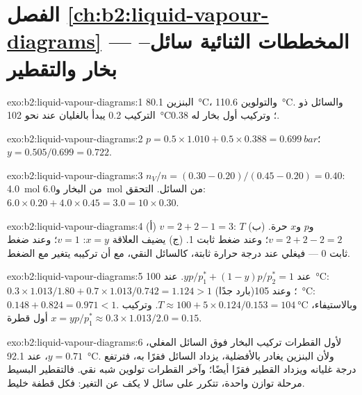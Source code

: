 \section*{الفصل \ref{ch:b2:liquid-vapour-diagrams} --- المخططات الثنائية سائل--بخار والتقطير}

\begin{solution}{exo:b2:liquid-vapour-diagrams:1}
البنزين \qty{80.1}{\degreeCelsius}، والتولوين \qty{110.6}{\degreeCelsius}. والسائل
ذو التركيب 0.2 يبدأ بالغليان عند نحو \qty{102}{\degreeCelsius}؛ وتركيب أول
بخار له 0.38.
\end{solution}

\begin{solution}{exo:b2:liquid-vapour-diagrams:2}
$p = 0.5 \times 1.010 + 0.5 \times 0.388 = \qty{0.699}{bar}$؛
$y = 0.505/0.699 = 0.722$.
\end{solution}

\begin{solution}{exo:b2:liquid-vapour-diagrams:3}
$n_V/n = (0.30 - 0.20)/(0.45 - 0.20) = 0.40$: \qty{4.0}{mol} من البخار 
و\qty{6.0}{mol} من السائل. التحقق: $6.0 \times 0.20 + 4.0 \times 0.45 = 3.0 = 10
\times 0.30$.
\end{solution}

\begin{solution}{exo:b2:liquid-vapour-diagrams:4}
(أ) $v = 2 + 2 - 1 = 3$: $T$ و$p$ و$x$ حرة. (ب) $v = 2 + 2 - 2 = 2$؛ وعند
ضغط ثابت 1. (ج) يضيف  العلاقة $x = y$: $v = 1$؛ وعند ضغط ثابت
0 --- فيغلي  عند درجة حرارة ثابتة، كالسائل النقي،
مع أن تركيبه يتغير مع الضغط.
\end{solution}

\begin{solution}{exo:b2:liquid-vapour-diagrams:5}
عند  $yp/p_1^* + (1 - y)p/p_2^* = 1$. عند \qty{100}{\degreeCelsius}:
$0.3 \times 1.013/1.80 + 0.7 \times 1.013/0.742 = 1.124 > 1$ (بارد جدًا)؛ وعند
\qty{105}{\degreeCelsius}: $0.148 + 0.824 = 0.971 < 1$. وبالاستيفاء، $T \approx
100 + 5 \times 0.124/0.153 = \qty{104}{\degreeCelsius}$. وتركيب أول قطرة $x =
yp/p_1^* \approx 0.3 \times 1.013/2.0 = 0.15$.
\end{solution}

\begin{solution}{exo:b2:liquid-vapour-diagrams:6}
لأول القطرات تركيب البخار فوق السائل المغلي،
$y = 0.71$، عند \qty{92.1}{\degreeCelsius}. ولأن البنزين يغادر بالأفضلية، يزداد
السائل فقرًا به، فترتفع درجة غليانه ويزداد القطير
فقرًا أيضًا؛ وآخر القطرات تولوين شبه نقي. فالتقطير البسيط
مرحلة توازن واحدة، تتكرر على سائل لا يكف عن التغير: فكل
قطفة خليط.
\end{solution}

